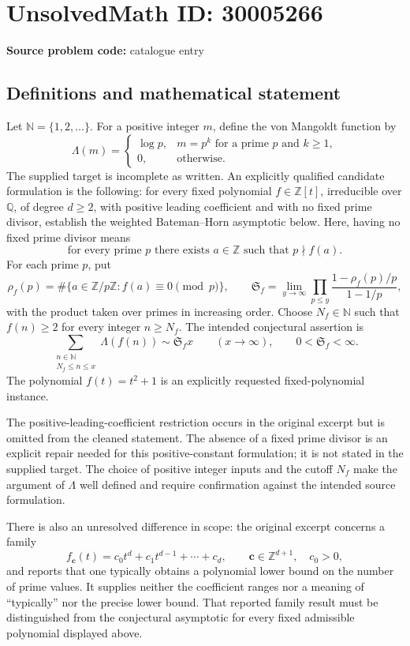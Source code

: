 \documentclass[11pt]{article}
\newcommand{\N}{\mathbb{N}}
\newcommand{\Z}{\mathbb{Z}}
\newcommand{\Q}{\mathbb{Q}}
\begin{document}
\section*{UnsolvedMath ID: 30005266}
\textbf{Source problem code:} catalogue entry
\subsection{Definitions and mathematical statement}
Let \(\N=\{1,2,\ldots\}\). For a positive integer \(m\), define the von Mangoldt function by
\[
\Lambda(m)=\begin{cases}\log p,&m=p^k\text{ for a prime }p\text{ and }k\geq1,\\0,&\text{otherwise}.\end{cases}
\]
The supplied target is incomplete as written. An explicitly qualified candidate formulation is the following: for every fixed polynomial \(f\in\Z[t]\), irreducible over \(\Q\), of degree \(d\geq2\), with positive leading coefficient and with no fixed prime divisor, establish the weighted Bateman--Horn asymptotic below. Here, having no fixed prime divisor means
\[
\text{for every prime }p\text{ there exists }a\in\Z\text{ such that }p\nmid f(a).
\]
For each prime \(p\), put
\[
\rho_f(p)=\#\{a\in\Z/p\Z:f(a)\equiv0\pmod p\},\qquad
\mathfrak S_f=\lim_{y\to\infty}\prod_{p\leq y}\frac{1-\rho_f(p)/p}{1-1/p},
\]
with the product taken over primes in increasing order. Choose \(N_f\in\N\) such that \(f(n)\geq2\) for every integer \(n\geq N_f\). The intended conjectural assertion is
\[
\sum_{\substack{n\in\N\\N_f\leq n\leq x}}\Lambda(f(n))\sim\mathfrak S_f x
\qquad(x\to\infty),\qquad 0<\mathfrak S_f<\infty.
\]
The polynomial \(f(t)=t^2+1\) is an explicitly requested fixed-polynomial instance.

The positive-leading-coefficient restriction occurs in the original excerpt but is omitted from the cleaned statement. The absence of a fixed prime divisor is an explicit repair needed for this positive-constant formulation; it is not stated in the supplied target. The choice of positive integer inputs and the cutoff \(N_f\) make the argument of \(\Lambda\) well defined and require confirmation against the intended source formulation.

There is also an unresolved difference in scope: the original excerpt concerns a family
\[
f_{\mathbf c}(t)=c_0t^d+c_1t^{d-1}+\cdots+c_d,
\qquad \mathbf c\in\Z^{d+1},\quad c_0>0,
\]
and reports that one typically obtains a polynomial lower bound on the number of prime values. It supplies neither the coefficient ranges nor a meaning of ``typically'' nor the precise lower bound. That reported family result must be distinguished from the conjectural asymptotic for every fixed admissible polynomial displayed above.
\end{document}
